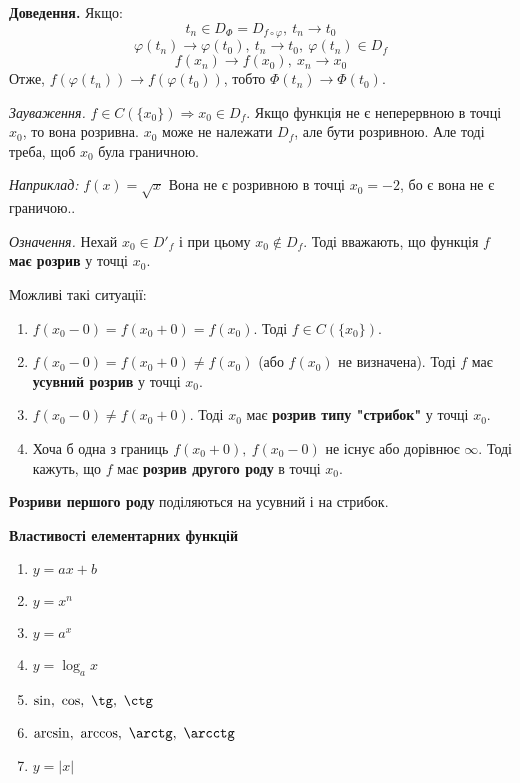 \documentclass[12pt]{report}
\begin{document}
\textbf{Доведення.} Якщо:
$$t_n \in D_{\Phi}  = D_{f \circ \varphi},\ t_n \to t_0$$
$$\varphi(t_n) \to \varphi(t_0),\ t_n \to t_0,\ \varphi(t_n) \in D_f$$
$$f(x_n) \to f(x_0),\ x_n \to x_0$$
Отже, $f(\varphi(t_n)) \to f(\varphi(t_0))$, тобто $\Phi(t_n) \to \Phi(t_0)$.

\vspace{5mm}

\textit{Зауваження.} $f \in C(\{ x_0\}) \Longrightarrow x_0 \in D_f$. Якщо функція не є неперервною в точці $x_0$, то вона розривна. $x_0$ може не належати $D_f$, але бути розривною. Але тоді треба, щоб $x_0$ була граничною.

\textit{Наприклад:} $f(x) = \sqrt{x}$ Вона не є розривною в точці $x_0= -2$, бо є вона не є граничою.. 

\textit{Означення.} Нехай $x_0 \in D'_f$ і при цьому $x_0 \notin D_f$. Тоді вважають, що функція $f$ \textbf{має розрив} у точці $x_0$.

Можливі такі ситуації:
\begin{enumerate}
    \item $f(x_0 - 0) = f(x_0 + 0) = f(x_0)$. Тоді $f \in C(\{ x_0\})$.
    \item $f(x_0 - 0) = f(x_0 + 0) \neq f(x_0)$ (або $f(x_0)$ не визначена). Тоді $f$ має \textbf{усувний розрив} у точці $x_0$.
    \item $f(x_0-0) \neq f(x_0+0)$. Тоді $x_0$ має \textbf{розрив типу "стрибок"} у точці $x_0$.
    \item Хоча б одна з границь $f(x_0 + 0),\ f(x_0 - 0)$ не існує або дорівнює $\infty$. Тоді кажуть, що $f$ має \textbf{розрив другого роду} в точці $x_0$.
\end{enumerate}
\textbf{Розриви першого роду} поділяються на усувний і на стрибок.

\begin{center}
    \textbf{\large Властивості елементарних функцій}
\end{center}

\begin{enumerate}
    \item $y = ax + b$
    \item $y = x^n$
    \item $y = a^x$
    \item $y = \log_{a}x$
    \item $\sin,\ \cos,\ \tg,\ \ctg$
    \item $\arcsin,\ \arccos,\ \arctg,\ \arcctg$    
    \item $y = |x|$
\end{enumerate}
\end{document}
